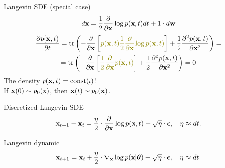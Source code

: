 \begin{frame}{Langevin SDE (special case)}
	\[
		d \mathbf{x} = \frac{1}{2} \frac{\partial}{\partial \mathbf{x}} \log p(\mathbf{x}, t) d t + 1 \cdot d \mathbf{w}
	\]
	\begin{multline*}
		\frac{\partial p(\bx, t)}{\partial t} =  \text{tr} \left(- \frac{\partial}{\partial \bx}\left[ {\color{olive}p(\bx, t) \frac{1}{2} \frac{\partial}{\partial \bx} \log p(\bx, t)} \right]  + \frac{1}{2} \frac{\partial^2 p(\bx, t)}{\partial \bx^2} \right) = \\
		= \text{tr} \left(- \frac{\partial}{\partial \bx}\left[ {\color{olive}\frac{1}{2} \frac{\partial}{\partial \bx} p(\bx, t) } \right]  + \frac{1}{2} \frac{\partial^2 p(\bx, t)}{\partial \bx^2} \right) = 0
	\end{multline*}
	The density $p(\mathbf{x}, t) = \text{const}(t)$! \\ If $\mathbf{x}(0) \sim p_0(\mathbf{x})$, then $\mathbf{x}(t) \sim p_0(\mathbf{x})$.
	\begin{block}{Discretized Langevin SDE}
		\vspace{-0.3cm}
		\[
			\mathbf{x}_{t + 1} - \mathbf{x}_t = \frac{\eta}{2} \cdot \frac{\partial}{\partial \mathbf{x}} \log p(\mathbf{x}, t) + \sqrt{\eta} \cdot \boldsymbol{\epsilon}, \quad \eta \approx dt.
		\]
		\vspace{-0.4cm}
	\end{block}
	\begin{block}{Langevin dynamic}
		\vspace{-0.3cm}
		\[
			\mathbf{x}_{t + 1} = \mathbf{x}_t + \frac{\eta}{2} \cdot \nabla_{\mathbf{x}} \log p(\mathbf{x} | \boldsymbol{\theta}) + \sqrt{\eta} \cdot \boldsymbol{\epsilon}, \quad \eta \approx dt.
		\]
		\vspace{-0.3cm}
	\end{block}
\end{frame}

